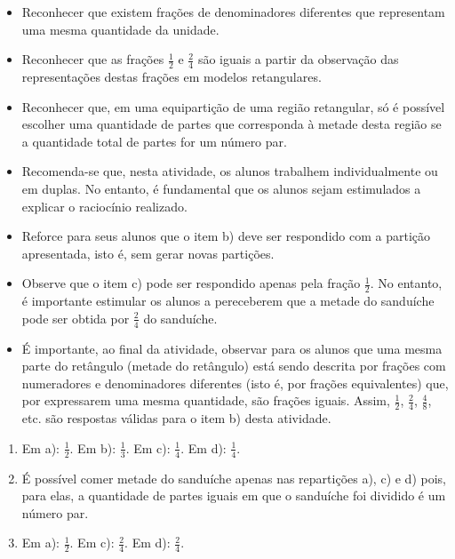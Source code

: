 \begin{atividade}\label{chap4-ativ1}
\objetivos
  \begin{itemize} %
    \item Reconhecer que existem frações de denominadores diferentes que representam uma mesma quantidade da unidade.
    \item       Reconhecer que as frações       $\frac{1}{2}$       e
$\frac{2}{4}$       são iguais a partir da observação das representações destas
frações em modelos retangulares.
    \item       Reconhecer que, em uma equipartição de uma região retangular, só
é possível escolher uma quantidade de partes que corresponda à metade desta
região se a quantidade total de partes for um número par.

\end{itemize} %

\discussoes
\begin{itemize} %
    \item       Recomenda-se que, nesta atividade, os alunos trabalhem
individualmente ou em duplas. No entanto, é fundamental que os alunos sejam
estimulados a explicar o raciocínio realizado.
    \item       Reforce para seus alunos que o item b) deve ser respondido com a
partição apresentada, isto é, sem gerar novas partições.
    \item       Observe que o item c) pode ser respondido apenas pela fração
  $\frac{1}{2}$. No entanto, é importante estimular os alunos a pereceberem que
a metade do sanduíche pode ser obtida por       $\frac{2}{4}$       do
sanduíche.
    \item       É importante, ao final da atividade, observar para os alunos que
uma mesma parte do retângulo (metade do retângulo) está sendo descrita por
frações com numeradores e denominadores diferentes (isto é, por frações
equivalentes) que, por expressarem uma mesma quantidade, são frações iguais. Assim,       $\frac{1}{2}$,       $\frac{2}{4}$,
$\frac{4}{8}$, etc. são respostas válidas para o item b) desta atividade.
\end{itemize} %

\solucao
\begin{enumerate} %
    \item       Em a):       $\frac{1}{2}$. Em b):       $\frac{1}{3}$. Em c):
    $\frac{1}{4}$. Em d):       $\frac{1}{4}$.
    \item       É possível comer metade do sanduíche apenas nas repartições a),
c) e d) pois, para elas, a quantidade de partes iguais em que o sanduíche foi
dividido é um número par.
    \item       Em a):       $\frac{1}{2}$. Em c):       $\frac{2}{4}$. Em d):
    $\frac{2}{4}$.
\end{enumerate} %

\end{atividade}

